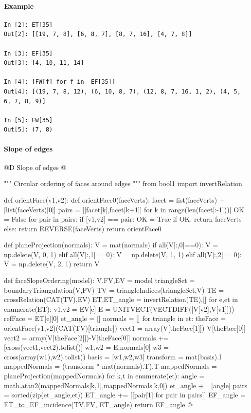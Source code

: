 \documentclass[11pt,oneside]{article}    %
\begin{document}
\paragraph{Example}

{\small
\begin{verbatim}
In [2]: ET[35]
Out[2]: [[19, 7, 8], [6, 8, 7], [8, 7, 16], [4, 7, 8]]

In [3]: EF[35]
Out[3]: [4, 10, 11, 14]

In [4]: [FW[f] for f in  EF[35]]
Out[4]: [(19, 7, 8, 12), (6, 10, 8, 7), (12, 8, 7, 16, 1, 2), (4, 5, 6, 7, 8, 9)]

In [5]: EW[35]
Out[5]: (7, 8)
\end{verbatim}}



\paragraph{Slope of edges}

@D Slope of edges
@{""" Circular ordering of faces around edges """
from bool1 import invertRelation

def orientFace(v1,v2):
    def orientFace0(faceVerts):
        facet = list(faceVerts) + [list(faceVerts)[0]]
        pairs = [[facet[k],facet[k+1]] for k in range(len(facet[:-1]))]
        OK = False
        for pair in pairs:
            if [v1,v2] == pair: OK = True
        if OK: return faceVerts
        else: return REVERSE(faceVerts)
    return orientFace0

def planeProjection(normals):
    V = mat(normals)
    if all(V[:,0]==0): V = np.delete(V, 0, 1)
    elif all(V[:,1]==0): V = np.delete(V, 1, 1)
    elif all(V[:,2]==0): V = np.delete(V, 2, 1)
    return V

def faceSlopeOrdering(model):
    V,FV,EV = model
    triangleSet = boundaryTriangulation(V,FV)
    TV = triangleIndices(triangleSet,V)
    TE = crossRelation(CAT(TV),EV)
    ET,ET_angle = invertRelation(TE),[]
    for e,et in enumerate(ET):
        v1,v2 = EV[e]
        E = UNITVECT(VECTDIFF([V[v2],V[v1]]))
        refFace = ET[e][0]
        et_angle = []
        normals = []
        for triangle in et:
            theFace = orientFace(v1,v2)(CAT(TV)[triangle])
            vect1 = array(V[theFace[1]])-V[theFace[0]]
            vect2 = array(V[theFace[2]])-V[theFace[0]]
            normals += [cross(vect1,vect2).tolist()]
        w1,w2 = E,normals[0]
        w3 = cross(array(w1),w2).tolist()
        basis = [w1,w2,w3]
        transform = mat(basis).I
        mappedNormals = (transform * mat(normals).T).T
        mappedNormals = planeProjection(mappedNormals)
        for k,t in enumerate(et):
            angle = math.atan2(mappedNormals[k,1],mappedNormals[k,0])
            et_angle += [angle]
        pairs = sorted(zip(et_angle,et))
        ET_angle += [[pair[1] for pair in pairs]]
    EF_angle = ET_to_EF_incidence(TV,FV, ET_angle)
    return EF_angle
@}
\end{document}
